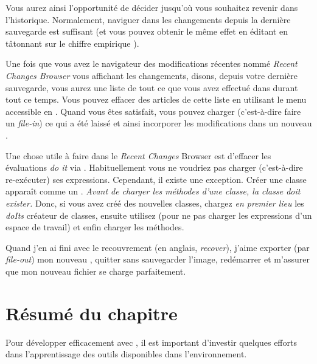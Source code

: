 \documentclass[a4paper,10pt,twoside]{book}
\begin{document}

Vous aurez ainsi l'opportunité
de décider jusqu'où vous souhaitez revenir dans l'historique.
Normalement, naviguer dans les changements depuis la dernière sauvegarde
est suffisant (et vous pouvez obtenir le même effet en éditant 
 en tâtonnant sur le chiffre empirique
).

Une fois que vous avez le navigateur des modifications récentes nommé
\emph{Recent Changes Browser} vous affichant les changements, disons, depuis votre
dernière sauvegarde, vous aurez une liste de tout ce que vous avez effectué 
dans \pharo durant tout ce temps.
Vous pouvez effacer des articles de cette liste en utilisant le menu
accessible en \actclickant.
Quand vous êtes satisfait, vous
pouvez charger (c'est-à-dire faire un \emph{file-in}) ce qui a été laissé
et ainsi incorporer les modifications dans un nouveau \changeset.

Une chose utile à faire dans le \emph{Recent Changes} Browser est
d'effacer les évaluations \emph{do it} via . 
Habituellement vous ne voudriez pas charger (c'est-à-dire re-exécuter) ses expressions.
Cependant, il existe une exception.
Créer une classe apparaît comme un .
\emph{Avant de charger les méthodes d'une classe, la classe doit exister.}
Donc, si vous avez créé des nouvelles classes, chargez \emph{en premier lieu} 
les \emph{doIts} créateur de classes, ensuite utilisez  
(pour ne pas charger les expressions d'un espace de travail) et enfin charger les méthodes.

Quand j'en ai fini avec le recouvrement (en anglais, \emph{recover}), 
j'aime exporter (par \emph{file-out}) mon nouveau \changeset, quitter \pharo
sans sauvegarder l'image, redémarrer et m'assurer que mon nouveau fichier
se charge parfaitement.

\section{Résumé du chapitre}

Pour développer efficacement avec \pharo, il est
important d'investir quelques efforts dans l'apprentissage des outils
disponibles dans l'environnement.
\end{document}
